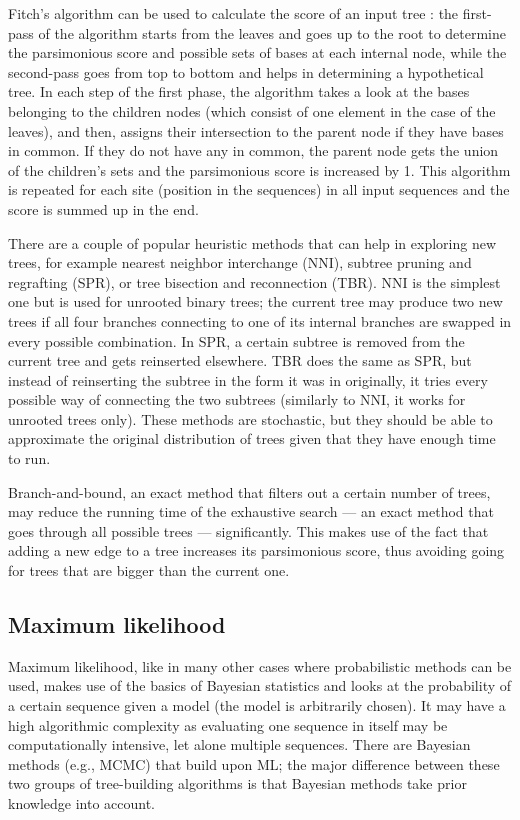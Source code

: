 \documentclass[11pt,twocolumn]{article}
\begin{document}
Fitch's algorithm \cite{Fitch1971} can be used to calculate the score of an input tree  \cite{Ortiz2016} \cite{Stoye2009}: the first-pass of the algorithm starts from the leaves and goes up to the root to determine the parsimonious score and possible sets of bases at each internal node, while the second-pass goes from top to bottom and helps in determining a hypothetical tree. In each step of the first phase, the algorithm takes a look at the bases belonging to the children nodes (which consist of one element in the case of the leaves), and then, assigns their intersection to the parent node if they have bases in common. If they do not have any in common, the parent node gets the union of the children's sets and the parsimonious score is increased by 1. This algorithm is repeated for each site (position in the sequences) in all input sequences and the score is summed up in the end.

There are a couple of popular heuristic methods that can help in exploring new trees, for example nearest neighbor interchange (NNI), subtree pruning and regrafting (SPR), or tree bisection and reconnection (TBR). NNI is the simplest one but is used for unrooted binary trees; the current tree may produce two new trees if all four branches connecting to one of its internal branches are swapped in every possible combination. In SPR, a certain subtree is removed from the current tree and gets reinserted elsewhere. TBR does the same as SPR, but instead of reinserting the subtree in the form it was in originally, it tries every possible way of connecting the two subtrees (similarly to NNI, it works for unrooted trees only). These methods are stochastic, but they should be able to approximate the original distribution of trees given that they have enough time to run.

Branch-and-bound, an exact method that filters out a certain number of trees, may reduce the running time of the exhaustive search — an exact method that goes through all possible trees — significantly. This makes use of the fact that adding a new edge to a tree increases its parsimonious score, thus avoiding going for trees that are bigger than the current one.

\subsection{Maximum likelihood}

Maximum likelihood, like in many other cases where probabilistic methods can be used, makes use of the basics of Bayesian statistics and looks at the probability of a certain sequence given a model (the model is arbitrarily chosen). It may have a high algorithmic complexity as evaluating one sequence in itself may be computationally intensive, let alone multiple sequences. There are Bayesian methods (e.g., MCMC) that build upon ML; the major difference between these two groups of tree-building algorithms is that Bayesian methods take prior knowledge into account.
\end{document}
